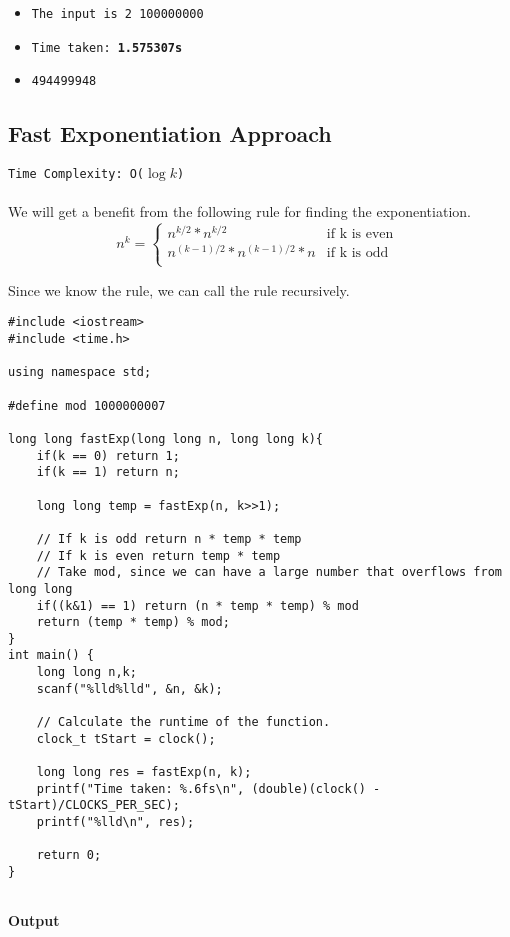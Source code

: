 \documentclass[12pt]{article}
\begin{document}
\begin{itemize}
  \item \texttt{The input is 2 100000000} 
  \item \texttt{Time taken: \textbf{1.575307s}} 
  \item \texttt{494499948}
\end{itemize}

\clearpage

\subsection{Fast Exponentiation Approach }
\texttt{Time Complexity: O($\log{k}$) } \\ \\
We will get a benefit from the following rule for finding the exponentiation.
\begin{equation}
  n^k =
  \begin{cases}
    n^{k/2} * n^{k/2} & \text{if k is even } \\
    n^{(k-1)/2} * n^{(k-1)/2} * n & \text{if k is odd } \\
  \end{cases}
\end{equation}

Since we know the rule, we can call the rule recursively.
\begin{verbatim}
#include <iostream>
#include <time.h>

using namespace std;

#define mod 1000000007

long long fastExp(long long n, long long k){
    if(k == 0) return 1;
    if(k == 1) return n;
    
    long long temp = fastExp(n, k>>1);
    
    // If k is odd return n * temp * temp
    // If k is even return temp * temp
    // Take mod, since we can have a large number that overflows from long long
    if((k&1) == 1) return (n * temp * temp) % mod
    return (temp * temp) % mod;
}
int main() {
    long long n,k;
    scanf("%lld%lld", &n, &k);
    
    // Calculate the runtime of the function.
    clock_t tStart = clock();
    
    long long res = fastExp(n, k);
    printf("Time taken: %.6fs\n", (double)(clock() - tStart)/CLOCKS_PER_SEC);
    printf("%lld\n", res);
    
    return 0;
}


\end{verbatim}
\textbf{Output}
\end{document}

